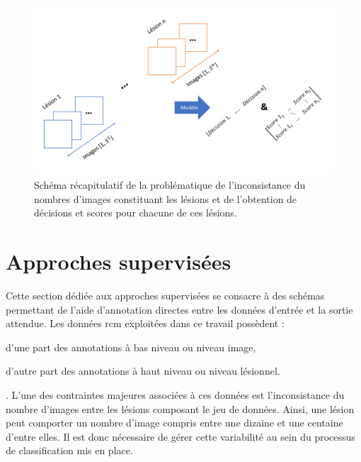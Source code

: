 \begin{figure}[H]
    \centering
    \includegraphics[width=0.75\linewidth]{contents/chapter_6/resources/scheme_patient_decision_objectives.pdf}
    \caption{Schéma récapitulatif de la problématique de l'inconsistance du nombres d'images constituant les lésions et de l'obtention de décisions et scores pour chacune de ces lésions.}
    \label{fig:scheme_patient_decision_objectives}
\end{figure}\par
\clearpage

\section{Approches supervisées}
Cette section dédiée aux approches supervisées se consacre à des schémas permettant de   l'aide d'annotation directes entre les données d'entrée et la sortie attendue. Les données \gls{rcm} exploitées dans ce travail possèdent :
\begin{inlinerate}
    \item d'une part des annotations à bas niveau ou niveau image,
    \item d'autre part des annotations à haut niveau ou niveau lésionnel. 
\end{inlinerate}. L'une des contraintes majeures associées à ces données est l'inconsistance du nombre d'images entre les lésions composant le jeu de données. Ainsi, une lésion peut comporter un nombre d'image compris entre une dizaine et une centaine d'entre elles. Il est donc nécessaire de gérer cette variabilité au sein du processus de classification mis en place.\par

